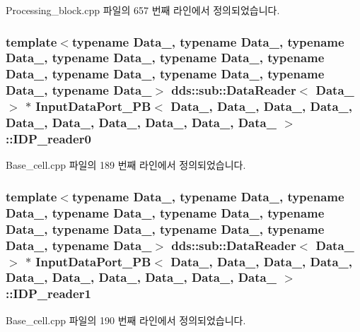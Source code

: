 Processing\+\_\+block.\+cpp 파일의 657 번째 라인에서 정의되었습니다.

\subsubsection[{\texorpdfstring{I\+D\+P\+\_\+reader0}{IDP_reader0}}]{\setlength{\rightskip}{0pt plus 5cm}template$<$typename Data\+\_, typename Data\+\_, typename Data\+\_, typename Data\+\_, typename Data\+\_, typename Data\+\_, typename Data\+\_, typename Data\+\_, typename Data\+\_, typename Data\+\_$>$ dds\+::sub\+::\+Data\+Reader$<$ Data\+\_ $>$ $\ast$ {\bf Input\+Data\+Port\+\_\+\+PB}$<$ Data\+\_, Data\+\_, Data\+\_, Data\+\_, Data\+\_, Data\+\_, Data\+\_, Data\+\_, Data\+\_, Data\+\_ $>$\+::I\+D\+P\+\_\+reader0}\hypertarget{classInputDataPort__PB_ad5db737ed9b58633643a0595cd476083}{}\label{classInputDataPort__PB_ad5db737ed9b58633643a0595cd476083}


Base\+\_\+cell.\+cpp 파일의 189 번째 라인에서 정의되었습니다.

\subsubsection[{\texorpdfstring{I\+D\+P\+\_\+reader1}{IDP_reader1}}]{\setlength{\rightskip}{0pt plus 5cm}template$<$typename Data\+\_, typename Data\+\_, typename Data\+\_, typename Data\+\_, typename Data\+\_, typename Data\+\_, typename Data\+\_, typename Data\+\_, typename Data\+\_, typename Data\+\_$>$ dds\+::sub\+::\+Data\+Reader$<$ Data\+\_ $>$ $\ast$ {\bf Input\+Data\+Port\+\_\+\+PB}$<$ Data\+\_, Data\+\_, Data\+\_, Data\+\_, Data\+\_, Data\+\_, Data\+\_, Data\+\_, Data\+\_, Data\+\_ $>$\+::I\+D\+P\+\_\+reader1}\hypertarget{classInputDataPort__PB_a70658e2c639e868dc0524b4f97c09da8}{}\label{classInputDataPort__PB_a70658e2c639e868dc0524b4f97c09da8}


Base\+\_\+cell.\+cpp 파일의 190 번째 라인에서 정의되었습니다.

